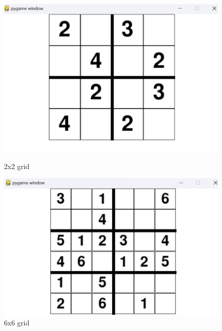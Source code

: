 \documentclass[]{final_report}
\begin{document}
\begin{figure}[ht]
    \centering 
    \begin{minipage}{0.3\textwidth} 
        \includegraphics[width=\textwidth]{images/2x2 unsolved.png} 
        \caption{2x2 grid} 
        \label{fig:unsolved 2x2} 
    \end{minipage} 
    \hfill 
    \begin{minipage}{0.3\textwidth} 
        \includegraphics[width=\textwidth]{images/6x6 unsolved.png} 
        \caption{6x6 grid} 
        \label{fig:unsolved 6x6} 
    \end{minipage} 
    \hfill 
    \begin{minipage}{0.3\textwidth} 

\end{minipage}
\end{figure}
\end{document}
